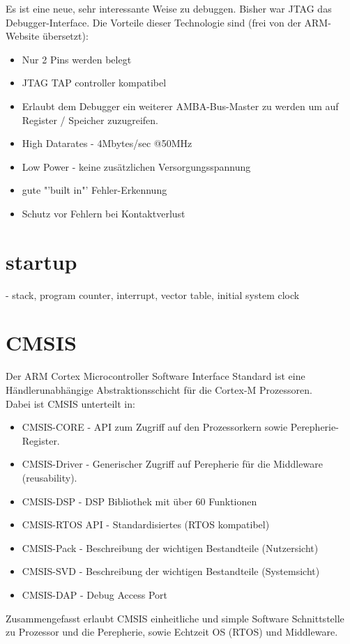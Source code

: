 Es ist eine neue, sehr interessante Weise zu debuggen. Bisher war JTAG das
Debugger-Interface. 
Die Vorteile dieser Technologie sind (frei von der ARM-Website \"ubersetzt):

\begin{itemize}
\item Nur 2 Pins werden belegt
\item JTAG TAP controller kompatibel
\item Erlaubt dem Debugger ein weiterer AMBA-Bus-Master zu werden um auf
Register / Speicher zuzugreifen.
\item High Datarates - 4Mbytes/sec @50MHz
\item Low Power - keine zus\"atzlichen Versorgungsspannung
\item gute "'built in"' Fehler-Erkennung
\item Schutz vor Fehlern bei Kontaktverlust
\end{itemize}  

\section{startup}
 - stack, program counter, interrupt, vector table, initial system clock

\section{CMSIS}
Der ARM Cortex Microcontroller Software Interface Standard ist eine 
H\"andlerunabh\"angige Abstraktionsschicht f\"ur die Cortex-M Prozessoren.\\
Dabei ist CMSIS unterteilt in:
\begin{itemize}
\item CMSIS-CORE - API zum Zugriff auf den Prozessorkern sowie Perepherie-Register.
\item CMSIS-Driver - Generischer Zugriff auf Perepherie f\"ur die Middleware
			(reusability).
\item CMSIS-DSP - DSP Bibliothek mit \"uber 60 Funktionen
\item CMSIS-RTOS API - Standardisiertes (RTOS kompatibel)
\item CMSIS-Pack - Beschreibung der wichtigen Bestandteile (Nutzersicht)
\item CMSIS-SVD - Beschreibung der wichtigen Bestandteile (Systemsicht)
\item CMSIS-DAP - Debug Access Port
\end{itemize}

Zusammengefasst erlaubt CMSIS einheitliche und simple Software Schnittstelle
zu Prozessor und die Perepherie, sowie Echtzeit OS (RTOS) und Middleware.

